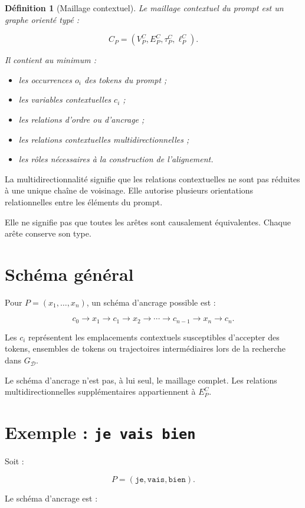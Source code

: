 \documentclass[11pt,a4paper,oneside]{book}
\newtheorem{definition}{Définition}[chapter]
\theoremstyle{remark}
\newcommand{\Dataset}{\mathcal{D}}
\begin{document}
\begin{definition}[Maillage contextuel]
Le maillage contextuel du prompt est un graphe orienté typé :

\[
C_P=
(V_P^C,E_P^C,\tau_P^C,\ell_P^C).
\]

Il contient au minimum :
\begin{itemize}
  \item les occurrences \(o_i\) des tokens du prompt ;
  \item les variables contextuelles \(c_i\) ;
  \item les relations d'ordre ou d'ancrage ;
  \item les relations contextuelles multidirectionnelles ;
  \item les rôles nécessaires à la construction de l'alignement.
\end{itemize}
\end{definition}

La multidirectionnalité signifie que les relations contextuelles
ne sont pas réduites à une unique chaîne de voisinage. Elle autorise
plusieurs orientations relationnelles entre les éléments du prompt.

Elle ne signifie pas que toutes les arêtes sont causalement
équivalentes. Chaque arête conserve son type.

\section{Schéma général}

Pour \(P=(x_1,\ldots,x_n)\), un schéma d'ancrage possible est :

\[
c_0\to x_1\to c_1\to x_2
\to\cdots\to c_{n-1}\to x_n\to c_n.
\]

Les \(c_i\) représentent les emplacements contextuels susceptibles
d'accepter des tokens, ensembles de tokens ou trajectoires
intermédiaires lors de la recherche dans \(G_{\Dataset}\).

Le schéma d'ancrage n'est pas, à lui seul, le maillage complet.
Les relations multidirectionnelles supplémentaires appartiennent
à \(E_P^C\).

\section{Exemple : \texttt{je vais bien}}

Soit :

\[
P=(\texttt{je},\texttt{vais},\texttt{bien}).
\]

Le schéma d'ancrage est :
\end{document}

